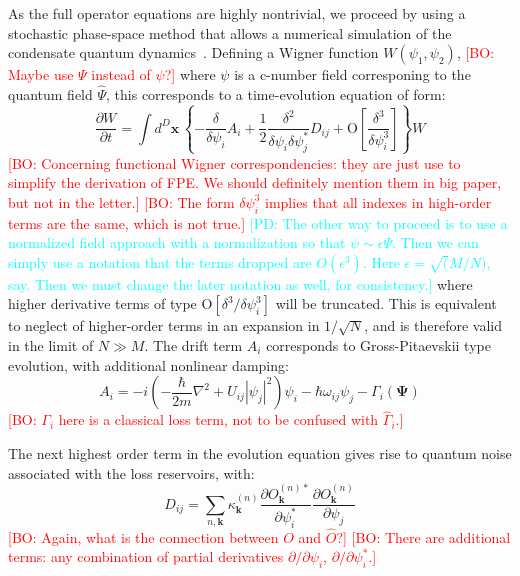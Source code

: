 \documentclass[aps,prl,twocolumn,showpacs,amsmath,amssymb,superscriptaddress]{revtex4-1}
\newcommand{\bogdansremark}[1]{\textcolor{red}{{[}BO: #1{]}}}
\newcommand{\petersremark}[1]{\textcolor{cyan}{{[}PD: #1{]}}}
\newcommand{\xvec}{\boldsymbol{x}}
\newcommand{\kvec}{\boldsymbol{k}}
\newcommand{\Psivec}{\boldsymbol{\Psi}}
\begin{document}
As the full operator equations are highly nontrivial,
we proceed by using a stochastic phase-space method
that allows a numerical simulation of the condensate quantum dynamics~\cite{Drummond1993, Steel1998}.
Defining a Wigner function $W\left(\psi_{1},\psi_{2}\right)$,
	\bogdansremark{Maybe use $\Psi$ instead of $\psi$?}
where $\psi$ is a c-number field corresponing to the quantum field $\hat{\Psi}$,
this corresponds to a time-evolution equation of form:
\begin{equation}
	\frac{\partial W}{\partial t} = \int d^D \xvec \,\left\{
		-\frac{\delta}{\delta\psi_{i}} A_{i} +
		\frac{1}{2} \frac{\delta^{2}}{\delta\psi_{i} \delta\psi_{j}^{*}}D_{ij} +
		\mbox{O} \left[ \frac{\delta^{3}}{\delta\psi_{i}^{3}} \right]
	\right\} W
\end{equation}
	\bogdansremark{Concerning functional Wigner correspondencies:
	they are just use to simplify the derivation of FPE.
	We should definitely mention them in big paper, but not in the letter.}
	\bogdansremark{The form $\delta\psi_{i}^{3}$ implies that all indexes in high-order terms
	are the same, which is not true.}
	\petersremark{The other way to proceed is to use a normalized field approach
	with a normalization so that $\psi \sim \epsilon\Psi$.
	Then we can simply use a notation that the terms dropped are $O(\epsilon^3)$.
	Here $\epsilon = \sqrt(M/N)$, say.
	Then we must change the later notation as well, for consistency.}
where higher derivative terms of type $\mbox{O}\left[\delta^3/\delta\psi_{i}^{3}\right]$
will be truncated.
This is equivalent to neglect of higher-order terms in an expansion in $1/\sqrt{N}$,
and is therefore valid in the limit of $N \gg M$.
The drift term $A_{i}$ corresponds to Gross-Pitaevskii type evolution,
with additional nonlinear damping:
\begin{equation}
	A_{i} = -i \left(
	 	-\frac{\hbar}{2m} \nabla^{2} + U_{ij} \left| \psi_{j} \right|^{2}
	\right) \psi_{i} -
	\hbar \omega_{ij} \psi_{j} -
	\Gamma_{i} \left( \Psivec \right)
\end{equation}
	\bogdansremark{$\Gamma_{i}$ here is a classical loss term,
	not to be confused with $\hat{\Gamma}_{i}$.}

The next highest order term in the evolution equation gives rise to
quantum noise associated with the loss reservoirs,
with:
\begin{equation}
	D_{ij} = \sum_{n,\kvec} \kappa_{\kvec}^{(n)}
	\frac{\partial O_{\kvec}^{(n)*}}{\partial\psi_{i}^{*}}
	\frac{\partial O_{\kvec}^{(n)}}{\partial\psi_{j}}
\end{equation}
	\bogdansremark{Again, what is the connection between $O$ and $\hat{O}$?}
	\bogdansremark{There are additional terms: any combination of partial derivatives
	$\partial/\partial\psi_{i}$, $\partial/\partial\psi_{i}^*$.}
\end{document}
